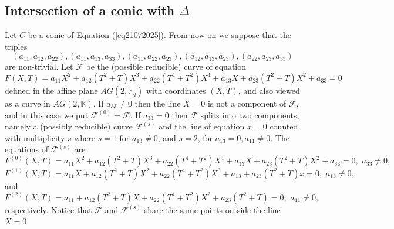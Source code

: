 \documentclass[sn-mathphys-num]{sn-jnl}%
\begin{document}
\subsection{Intersection of a conic with $\bar{\Delta}$}
\label{conicsec}
Let $C$ be a conic of Equation (\ref{eq21072025}). From now on we suppose that the triples
\begin{equation}
\label{eq21112025} (a_{11},a_{12},a_{22}), (a_{11},a_{13},a_{33}), (a_{11},a_{22},a_{23}), (a_{12},a_{13},a_{23}),(a_{22},a_{23},a_{33}) 
\end{equation}
are non-trivial. 
Let $\mathcal F$ be the (possible reducible) curve of equation
\begin{equation*}
\label{eq21072025A}
F(X,T)=a_{11}X^2+a_{12}(T^2+T)X^3+a_{22}(T^4+T^2)X^4+a_{13}X+a_{23}(T^2+T)X^2+a_{33}=0
\end{equation*}
defined in the affine plane $AG(2,\mathbb{F}_q)$ with coordinates $(X,T)$, and also viewed as a curve in $AG(2,\mathbb{K})$. If $a_{33}\ne 0$ then the line $X=0$ is not a component of $\mathcal{F}$, and in this case we put $\mathcal{F}^{(0)}=\mathcal{F}$. If $a_{33}=0$ then $\mathcal{F}$  splits into two components, namely a (possibly reducible) curve $\mathcal{F}^{(s)}$ and the line of equation $x=0$ counted with multiplicity $s$ where $s=1$ for $a_{13}\ne 0$, and $s=2$, for $a_{13}=0,a_{11}\ne 0$. The equations of $\mathcal{F}^{(s)}$ are
\begin{equation*}
\label{eq21072025A0}
F^{(0)}(X,T)=a_{11}X^2+a_{12}(T^2+T)X^3+a_{22}(T^4+T^2)X^4+a_{13}X+a_{23}(T^2+T)X^2+a_{33}=0,\,\, a_{33}\ne 0,
\end{equation*}
\begin{equation*}
\label{eq21072025AA}
F^{(1)}(X,T)=a_{11}X+a_{12}(T^2+T)X^2+a_{22}(T^4+T^2)X^3+a_{13}+a_{23}(T^2+T)x=0,\,\, a_{13}\ne 0,
\end{equation*}
and
\begin{equation*}
\label{eq21072025AAA}
F^{(2)}(X,T)=a_{11}+a_{12}(T^2+T)X+a_{22}(T^4+T^2)X^2+a_{23}(T^2+T)=0,\,\,  a_{11}\ne 0,
\end{equation*}
respectively.
Notice that $\mathcal{F}$ and $\mathcal{F}^{(s)}$ share the same points outside the line $X=0$.
\end{document}
